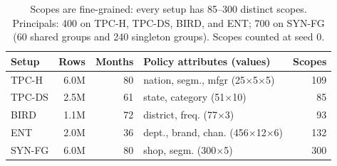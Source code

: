 \begin{table}[t]
\centering
\caption{Scopes are fine-grained: every setup has 85--300 distinct scopes. Principals: 400 on TPC-H, TPC-DS, BIRD, and ENT; 700 on SYN-FG (60 shared groups and 240 singleton groups). Scopes counted at seed 0.}
\label{tab:setups}
\footnotesize
\setlength{\tabcolsep}{2.5pt}
\begin{tabular}{@{}lrrlr@{}}
\toprule
Setup & Rows & Months & Policy attributes (values) & Scopes\\
\midrule
TPC-H & 6.0M & 80 & nation, segm., mfgr (25$\times$5$\times$5) & 109\\
TPC-DS & 2.5M & 61 & state, category (51$\times$10) & 85\\
BIRD & 1.1M & 72 & district, freq. (77$\times$3) & 93\\
ENT & 2.0M & 36 & dept., brand, chan. (456$\times$12$\times$6) & 132\\
SYN-FG & 6.0M & 80 & shop, segm. (300$\times$5) & 300\\
\bottomrule
\end{tabular}
\end{table}
